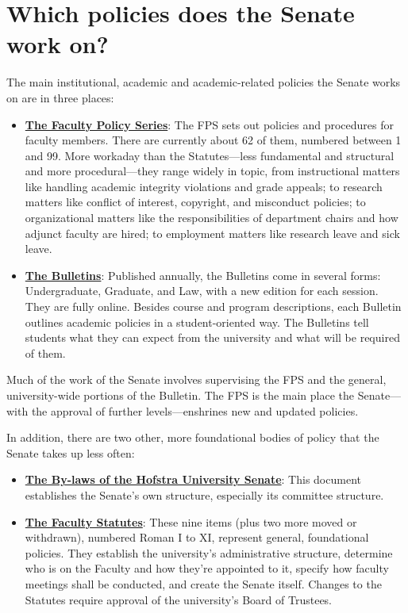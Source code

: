 \documentclass[12pt]{article}
\providecommand{\tightlist}{}
\begin{document}
\section{Which policies does the Senate work
on?}\label{which-policies-does-the-senate-work-on}

The main institutional, academic and academic-related policies the
Senate works on are in three places:

\begin{itemize}
\tightlist
\item
  \textbf{\href{https://www.hofstra.edu/senate/faculty-policy-series.html}{The
  Faculty Policy Series}}: The FPS sets out policies and procedures for
  faculty members. There are currently about 62 of them, numbered
  between 1 and 99. More workaday than the Statutes---less fundamental
  and structural and more procedural---they range widely in topic, from
  instructional matters like handling academic integrity violations and
  grade appeals; to research matters like conflict of interest,
  copyright, and misconduct policies; to organizational matters like the
  responsibilities of department chairs and how adjunct faculty are
  hired; to employment matters like research leave and sick leave.
\item
  \textbf{\href{https://bulletin.hofstra.edu}{The Bulletins}}: Published
  annually, the Bulletins come in several forms: Undergraduate,
  Graduate, and Law, with a new edition for each session. They are fully
  online. Besides course and program descriptions, each Bulletin
  outlines academic policies in a student-oriented way. The Bulletins
  tell students what they can expect from the university and what will
  be required of them.
\end{itemize}

\noindent Much of the work of the Senate involves supervising the FPS and the
general, university-wide portions of the Bulletin. The FPS is the main
place the Senate---with the approval of further levels---enshrines new
and updated policies.

In addition, there are two other, more foundational bodies of policy that the Senate takes up less often:
\begin{itemize}
\item \textbf{\href{https://www.hofstra.edu/pdf/faculty/senate/senatebylaws.pdf}{The By-laws of the Hofstra University Senate}}: This document establishes the Senate's own structure, especially its committee structure. 
\item \textbf{\href{https://www.hofstra.edu/pdf/faculty/senate/facultystatutes.pdf}{The Faculty Statutes}}: These nine items (plus two more moved or withdrawn), numbered Roman I to XI, represent general, foundational policies. They establish the university's administrative structure, determine who is on the Faculty and how they're appointed to it, specify how faculty meetings shall be conducted, and create the Senate itself. Changes to the Statutes require approval of the university's Board of Trustees.
\end{itemize}
\end{document}
